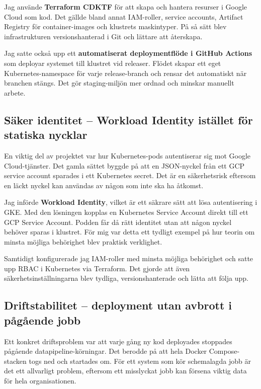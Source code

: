 Jag använde \textbf{Terraform CDKTF} för att skapa och hantera resurser i Google Cloud som
kod. Det gällde bland annat IAM-roller, service accounts, Artifact Registry för
container-images och klustrets maskintyper. På så sätt blev infrastrukturen versionshanterad i
Git och lättare att återskapa.

Jag satte också upp ett \textbf{automatiserat deploymentflöde i GitHub Actions} som deployar
systemet till klustret vid releaser. Flödet skapar ett eget Kubernetes-namespace för varje
release-branch och rensar det automatiskt när branchen stängs. Det gör staging-miljön mer
ordnad och minskar manuellt arbete.

\subsection{Säker identitet -- Workload Identity istället för statiska nycklar}
\label{subsec:security}

En viktig del av projektet var hur Kubernetes-pods autentiserar sig mot Google Cloud-tjänster.
Det gamla sättet byggde på att en JSON-nyckel från ett GCP service account sparades i ett
Kubernetes secret. Det är en säkerhetsrisk eftersom en läckt nyckel kan användas av någon som
inte ska ha åtkomst.

Jag införde \textbf{Workload Identity}, vilket är ett säkrare sätt att lösa autentisering i GKE.
Med den lösningen kopplas en Kubernetes Service Account direkt till ett GCP Service Account.
Podden får då rätt identitet utan att någon nyckel behöver sparas i klustret. För mig var detta
ett tydligt exempel på hur teorin om minsta möjliga behörighet blev praktisk verklighet.

Samtidigt konfigurerade jag IAM-roller med minsta möjliga behörighet och satte upp RBAC i
Kubernetes via Terraform. Det gjorde att även säkerhetsinställningarna blev tydliga,
versionshanterade och lätta att följa upp.

\subsection{Driftstabilitet -- deployment utan avbrott i pågående jobb}
\label{subsec:stability}

Ett konkret driftsproblem var att varje gång ny kod deployades stoppades pågående
datapipeline-körningar. Det berodde på att hela Docker Compose-stacken togs ned och
startades om. För ett system som kör schemalagda jobb är det ett allvarligt problem, eftersom
ett misslyckat jobb kan försena viktig data för hela organisationen.

